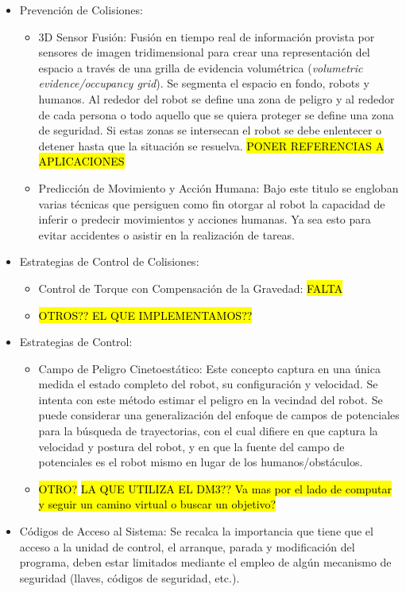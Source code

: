 \documentclass[withindex,glossary]{cam-thesis}
\begin{document}
\begin{itemize}
\item Prevención de Colisiones:
  \begin{itemize}
  	\item 3D Sensor Fusión: Fusión en tiempo real de información provista por sensores de imagen tridimensional para crear una representación del espacio a través de una grilla de evidencia volumétrica (\textit{volumetric evidence/occupancy grid}). Se segmenta el espacio en fondo, robots y humanos. Al rededor del robot se define una zona de peligro y al rededor de cada persona o todo aquello que se quiera proteger se define una zona de seguridad. Si estas zonas se intersecan el robot se debe enlentecer o detener hasta que la situación se resuelva. \hl{PONER REFERENCIAS A APLICACIONES}
    \item Predicción de Movimiento y Acción Humana: Bajo este titulo se engloban varias técnicas que persiguen como fin otorgar al robot la capacidad de inferir o predecir movimientos y acciones humanas. Ya sea esto para evitar accidentes o asistir en la realización de tareas. 
  \end{itemize}
\item Estrategias de Control de Colisiones:
  \begin{itemize}
    \item Control de Torque con Compensación de la Gravedad: \hl{FALTA}
    \item \hl{OTROS?? EL QUE IMPLEMENTAMOS??}
  \end{itemize}
\item Estrategias de Control:
  \begin{itemize}
  	\item Campo de Peligro Cinetoestático: Este concepto captura en una única medida el estado completo del robot, su configuración y velocidad. Se intenta con este método  estimar el peligro en la vecindad del robot. Se puede considerar una generalización del enfoque de campos de potenciales para la búsqueda de trayectorias, con el cual difiere en que captura la velocidad y postura del robot, y en que la fuente del campo de potenciales es el robot mismo en lugar de los humanos/obstáculos.
    \item \hl{OTRO?} \hl{LA QUE UTILIZA EL DM3?? Va mas por el lado de computar y seguir un camino virtual o buscar un objetivo?}
  \end{itemize}
\item Códigos de Acceso al Sistema: Se recalca la importancia que tiene que el acceso a la unidad de control, el arranque, parada y modificación del programa, deben estar limitados mediante el empleo de algún mecanismo de seguridad (llaves, códigos de seguridad, etc.).
\end{itemize}
\end{document}
